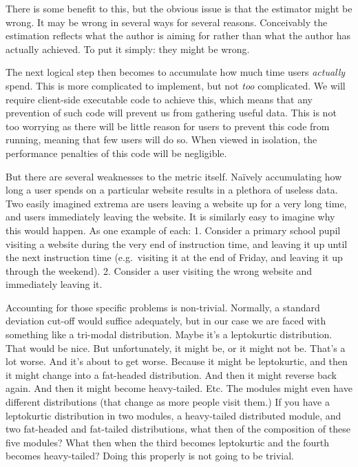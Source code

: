 \documentclass{article}
\begin{document}
\begin{multicols}{2}
There is some benefit to this, but the obvious issue is that the estimator 
might be wrong. It may be wrong in several ways for several reasons. 
Conceivably the estimation reflects what the author is aiming for rather than 
what the author has actually achieved. To put it simply: they might be wrong.

The next logical step then becomes to accumulate how much time users 
\emph{actually} spend. This is more complicated to implement, but not 
\emph{too} complicated. We will require client-side executable code to achieve 
this, which means that any prevention of such code will prevent us from 
gathering useful data. This is not too worrying as there will be little reason 
for users to prevent this code from running, meaning that few users will do 
so. When viewed in isolation, the performance penalties of this code will be 
negligible.

But there are several weaknesses to the metric itself. Naïvely accumulating 
how long a user spends on a particular website results in a plethora of 
useless data. Two easily imagined extrema are users leaving a website up for a 
very long time, and users immediately leaving the website. It is similarly 
easy to imagine why this would happen. As one example of each: 1. Consider a 
primary school pupil visiting a website during the very end of instruction 
time, and leaving it up until the next instruction time (e.g.\ visiting it at 
the end of Friday, and leaving it up through the weekend). 2. Consider a user 
visiting the wrong website and immediately leaving it.

Accounting for those specific problems is non-trivial. Normally, a standard 
deviation cut-off would suffice adequately, but in our case we are faced with 
something like a tri-modal distribution. Maybe it's a leptokurtic 
distribution. That would be nice. But unfortunately, it might be, or it might 
not be. That's a lot worse. And it's about to get worse. Because it might be 
leptokurtic, and then it might change into a fat-headed distribution. And then 
it might reverse back again. And then it might become heavy-tailed. Etc. The 
modules might even have different distributions (that change as more people 
visit them.) If you have a leptokurtic distribution in two modules, a 
heavy-tailed distributed module, and two fat-headed and fat-tailed 
distributions, what then of the composition of these five modules? What then 
when the third becomes leptokurtic and the fourth becomes heavy-tailed? Doing 
this properly is not going to be trivial.


\end{multicols}
\end{document}
